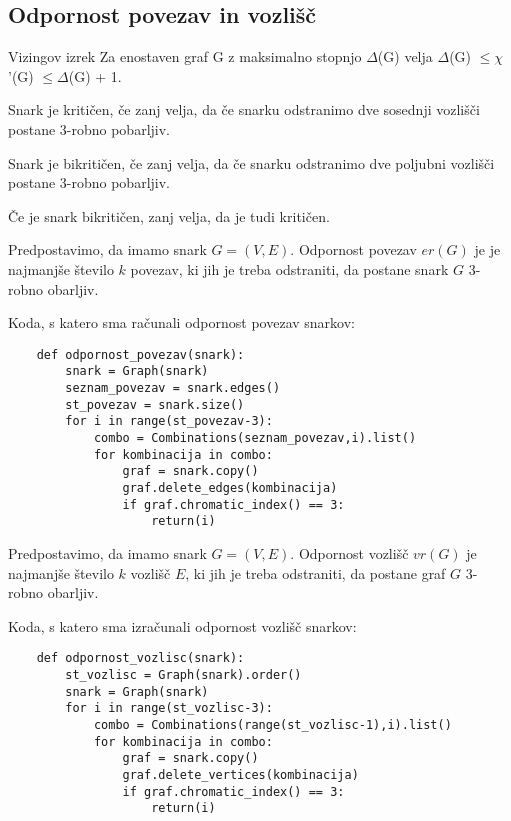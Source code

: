 \documentclass[a4paper, 10pt]{article}
\begin{document}
\subsection*{Odpornost povezav in vozlišč}

\begin{theorem}{Vizingov izrek}
    Za enostaven graf G z maksimalno stopnjo $\Delta$(G) velja
    $\Delta$(G) $\leq \chi$'(G) $\leq \Delta$(G) + 1. 
\end{theorem}

\begin{definition}
    Snark je kritičen, če zanj velja, da če snarku odstranimo dve sosednji vozlišči postane 3-robno pobarljiv. 
\end{definition}

\begin{definition}
    Snark je bikritičen, če zanj velja, da če snarku odstranimo dve poljubni vozlišči postane 3-robno pobarljiv. 
\end{definition}

\begin{theorem}
    Če je snark bikritičen, zanj velja, da je tudi kritičen.
\end{theorem}

\begin{definition}
    Predpostavimo, da imamo snark $G = (V,E)$. Odpornost povezav $er(G)$ je je najmanjše 
    število $k$ povezav, ki jih je treba odstraniti, da postane snark $G$ 3-robno obarljiv. 
\end{definition}
\pagebreak
Koda, s katero sma računali odpornost povezav snarkov:
\begin{lstlisting}
    def odpornost_povezav(snark):
        snark = Graph(snark)
        seznam_povezav = snark.edges()
        st_povezav = snark.size()
        for i in range(st_povezav-3):
            combo = Combinations(seznam_povezav,i).list()
            for kombinacija in combo:
                graf = snark.copy()
                graf.delete_edges(kombinacija)
                if graf.chromatic_index() == 3:
                    return(i)
\end{lstlisting}


\begin{definition}
    Predpostavimo, da imamo snark $G = (V,E)$. Odpornost vozlišč $vr(G)$ je najmanjše število $k$
    vozlišč $E$, ki jih je treba odstraniti, da postane graf $G$ 3-robno obarljiv.
\end{definition}

Koda, s katero sma izračunali odpornost vozlišč snarkov: 
\begin{lstlisting}
    def odpornost_vozlisc(snark):
        st_vozlisc = Graph(snark).order()
        snark = Graph(snark)
        for i in range(st_vozlisc-3):
            combo = Combinations(range(st_vozlisc-1),i).list() 
            for kombinacija in combo:
                graf = snark.copy()
                graf.delete_vertices(kombinacija)
                if graf.chromatic_index() == 3:
                    return(i)
\end{lstlisting}
\end{document}
